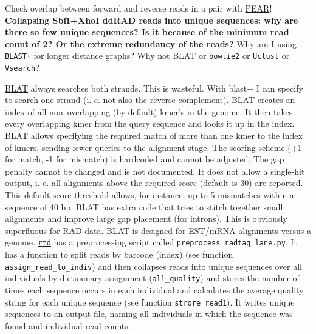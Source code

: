 \documentclass{article}\usepackage[]{graphicx}\usepackage[]{color}
\begin{document}
\newline\newline
Check overlap between forward and reverse reads in a pair with \href{https://github.com/torognes/vsearch}{PEAR}! \textbf{Collapsing SbfI+XhoI ddRAD reads into unique sequences: why are there so few unique sequences? Is it because of the minimum read count of 2? Or the extreme redundancy of the reads?}
\newline\newline
Why am I using \texttt{BLAST+} for longer distance graphs? Why not BLAT or \texttt{bowtie2} or \texttt{Uclust} or \texttt{Vsearch}?

\href{http://genome.ucsc.edu/goldenPath/help/blatSpec.html#blatUsage}{BLAT} \citep{Kent2002} always searches both strands. This is wasteful. With blast+ I can specify to search one strand (i. e. not also the reverse complement). BLAT creates an index of all non--overlapping (by default) kmer's in the genome. It then takes every overlapping kmer from the query sequence and looks it up in the index. BLAT allows specifying the required match of more than one kmer to the index of kmers, sending fewer queries to the alignment stage. The scoring scheme (+1 for match, -1 for mismatch) is hardcoded and cannot be adjusted. The gap penalty cannot be changed and is not documented. It does not allow a single-hit output, i. e. all alignments above the required score (default is 30) are reported. This default score threshold allows, for instance, up to 5 mismatches within a sequence of 40 bp. BLAT has extra code that tries to stitch together small alignments and improve large gap placement (for introns). This is obviously superfluous for RAD data. BLAT is designed for EST/mRNA alignments versus a genome.
\newline\newline
\href{https://github.com/brantp/rtd}{\texttt{rtd}} has a preprocessing script called \texttt{preprocess\_radtag\_lane.py}. It has a function to split reads by barcode (index) (see function \texttt{assign\_read\_to\_indiv}) and then collapses reads into unique sequences over all individuals by dictionnary assignment (\texttt{all\_quality}) and stores the number of times each sequence occurs in each individual and calculates the average quality string for each unique sequence (see function \texttt{strore\_read1}). It writes unique sequences to an output file, naming all individuals in which the sequence was found and individual read counts. 
\end{document}
